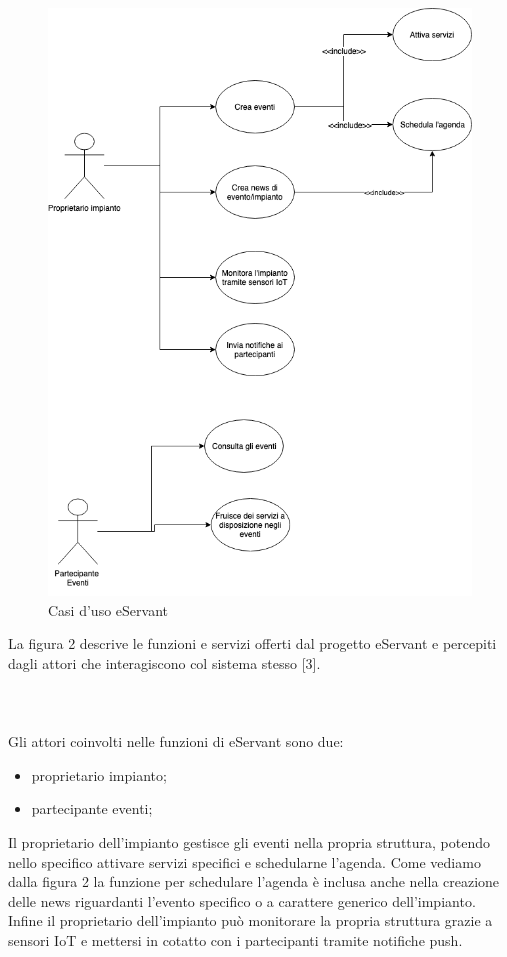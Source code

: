\begin{figure}[h!]
    \centering  
    \caption{Casi d'uso eServant}
    \includegraphics[scale=0.5]{img/cap1/casidiuso}
\end{figure}
La figura 2 descrive le funzioni e servizi offerti dal progetto eServant e percepiti dagli attori che interagiscono col sistema stesso [3].
\\\\\\\\Gli attori coinvolti nelle funzioni di eServant sono due:
\begin{itemize}
    \item proprietario impianto;
    \item partecipante eventi;
\end{itemize}

Il proprietario dell'impianto gestisce gli eventi nella propria struttura, potendo nello specifico attivare servizi specifici e schedularne l'agenda.
Come vediamo dalla figura 2 la funzione per schedulare l'agenda è inclusa anche nella creazione delle news riguardanti l'evento specifico o a
carattere generico dell'impianto.
Infine il proprietario dell'impianto può monitorare la propria struttura grazie a sensori IoT e mettersi in cotatto con i partecipanti tramite notifiche push.

